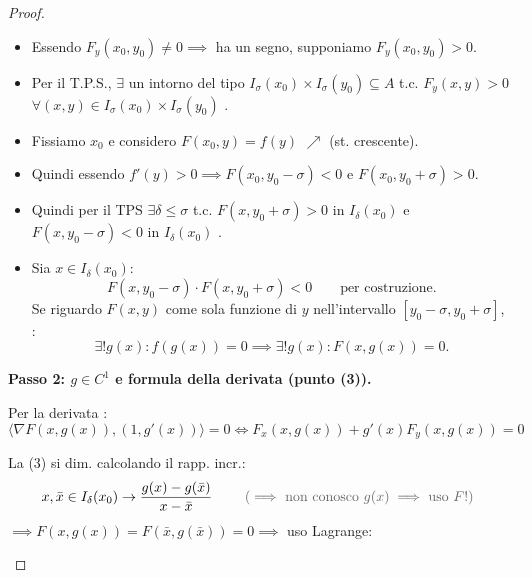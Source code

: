 \begin{proof}
\begin{itemize}
    \item Essendo $F_y(x_0, y_0) \neq 0 \implies$ ha un segno, supponiamo $F_y(x_0, y_0) > 0$.
    \item Per il T.P.S., $\exists$ un intorno del tipo $I_\sigma(x_0) \times I_\sigma(y_0) \subseteq A$ t.c. $F_y(x, y) > 0$ $\forall (x, y) \in I_\sigma(x_0) \times I_\sigma(y_0)$ .
    \item {} Fissiamo $x_0$ e considero $F(x_0, y) = f(y)$ $\nearrow$ (st. crescente).
    \item Quindi essendo $f'(y) > 0 \implies F(x_0, y_0 - \sigma) < 0$ e $F(x_0, y_0 + \sigma) > 0$.
    \item Quindi per il TPS $\exists \delta \le \sigma$ t.c. $F(x, y_0 + \sigma) > 0$ in $I_\delta(x_0)$ e $F(x, y_0 - \sigma) < 0$ in $I_\delta(x_0)$ .
    \item Sia $x \in I_\delta(x_0)$:
    \[
    F(x, y_0 - \sigma) \cdot F(x, y_0 + \sigma) < 0 \qquad \text{per costruzione.}
    \]
    Se riguardo $F(x, y)$ come sola funzione di $y$ nell'intervallo $[y_0 - \sigma, y_0 + \sigma]$, :
    \[
    \exists! g(x) : f(g(x)) = 0 \implies \exists! g(x) : F(x, g(x)) = 0.
    \]
\end{itemize}

\medskip
\noindent\textbf{Passo 2: $g \in C^1$ e formula della derivata (punto (3)).}

Per la derivata :
\[
\langle \nabla F(x, g(x)), (1, g'(x)) \rangle = 0 \iff F_x(x, g(x)) + g'(x) F_y(x, g(x)) = 0
\]

La (3) si dim. calcolando il rapp. incr.:
\[
x, \bar{x} \in I_\delta(x_0) \to \frac{g(x) - g(\bar{x})}{x - \bar{x}} \qquad \text{\pencilnote{($\implies$ non conosco $g(x) \implies$ uso $F!$)}}
\]
$\implies F(x, g(x)) = F(\bar{x}, g(\bar{x})) = 0 \implies$ uso Lagrange:

\begin{center}
\end{center}


\end{proof}
